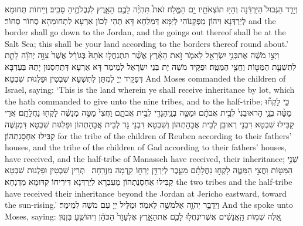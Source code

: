 {וְיָרַ֤ד הַגְּבוּל֙ הַיַּרְדֵּ֔נָה וְהָי֥וּ תוֹצְאֹתָ֖יו יָ֣ם הַמֶּ֑לַח זֹאת֩ תִּהְיֶ֨ה לָכֶ֥ם הָאָ֛רֶץ לִגְבֻלֹתֶ֖יהָ סָבִֽיב׃}
{וְיֵיחוֹת תְּחוּמָא לְיַרְדְּנָא וִיהוֹן מַפְּקָנוֹהִי לְיַמָּא דְּמִלְחָא דָּא תְּהֵי לְכוֹן אַרְעָא לִתְחוּמַהָא סְחוֹר סְחוֹר׃}
{and the border shall go down to the Jordan, and the goings out thereof shall be at the Salt Sea; this shall be your land according to the borders thereof round about.’}{}
{וַיְצַ֣ו מֹשֶׁ֔ה אֶת\maqqaf בְּנֵ֥י יִשְׂרָאֵ֖ל לֵאמֹ֑ר זֹ֣את הָאָ֗רֶץ אֲשֶׁ֨ר תִּתְנַחֲל֤וּ אֹתָהּ֙ בְּגוֹרָ֔ל אֲשֶׁר֙ צִוָּ֣ה יְהֹוָ֔ה לָתֵ֛ת לְתִשְׁעַ֥ת הַמַּטּ֖וֹת וַחֲצִ֥י הַמַּטֶּֽה׃}
{וּפַקֵּיד מֹשֶׁה יָת בְּנֵי יִשְׂרָאֵל לְמֵימַר דָּא אַרְעָא דְּתַחְסְנוּן יָתַהּ בְּעַדְבָּא דְּפַקֵּיד יְיָ לְמִתַּן לְתִשְׁעָא שִׁבְטִין וּפַלְגוּת שִׁבְטָא׃}
{And Moses commanded the children of Israel, saying: ‘This is the land wherein ye shall receive inheritance by lot, which the \lord\space hath commanded to give unto the nine tribes, and to the half-tribe;}{}
{כִּ֣י לָקְח֞וּ מַטֵּ֨ה בְנֵ֤י הָראוּבֵנִי֙ לְבֵ֣ית אֲבֹתָ֔ם וּמַטֵּ֥ה בְנֵֽי\maqqaf הַגָּדִ֖י לְבֵ֣ית אֲבֹתָ֑ם וַחֲצִי֙ מַטֵּ֣ה מְנַשֶּׁ֔ה לָקְח֖וּ נַחֲלָתָֽם׃}
{אֲרֵי קַבִּילוּ שִׁבְטָא דִּבְנֵי רְאוּבֵן לְבֵית אֲבָהָתְהוֹן וְשִׁבְטָא דִּבְנֵי גָּד לְבֵית אֲבָהָתְהוֹן וּפַלְגוּת שִׁבְטָא דִּמְנַשֶּׁה קַבִּילוּ אַחְסָנַתְהוֹן׃}
{for the tribe of the children of Reuben according to their fathers’ houses, and the tribe of the children of Gad according to their fathers’ houses, have received, and the half-tribe of Manasseh have received, their inheritance;}{}
{שְׁנֵ֥י הַמַּטּ֖וֹת וַחֲצִ֣י הַמַּטֶּ֑ה לָקְח֣וּ נַחֲלָתָ֗ם מֵעֵ֛בֶר לְיַרְדֵּ֥ן יְרֵח֖וֹ קֵ֥דְמָה מִזְרָֽחָה׃ \petucha }
{תְּרֵין שִׁבְטִין וּפַלְגוּת שִׁבְטָא קַבִּילוּ אַחְסָנַתְהוֹן מֵעִבְרָא לְיַרְדְּנָא דִּירִיחוֹ קִדּוּמָא מַדְנְחָא׃}
{the two tribes and the half-tribe have received their inheritance beyond the Jordan at Jericho eastward, toward the sun-rising.’}{}
{וַיְדַבֵּ֥ר יְהֹוָ֖ה אֶל\maqqaf מֹשֶׁ֥ה לֵּאמֹֽר׃}
{וּמַלֵּיל יְיָ עִם מֹשֶׁה לְמֵימַר׃}
{And the \lord\space spoke unto Moses, saying:}{}
{אֵ֚לֶּה שְׁמ֣וֹת הָֽאֲנָשִׁ֔ים אֲשֶׁר\maqqaf יִנְחֲל֥וּ לָכֶ֖ם אֶת\maqqaf הָאָ֑רֶץ אֶלְעָזָר֙ הַכֹּהֵ֔ן וִיהוֹשֻׁ֖עַ בִּן\maqqaf נֽוּן׃}
